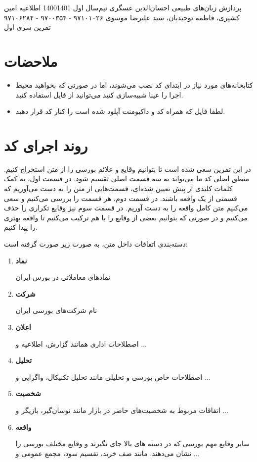 \documentclass[a4paper,12pt]{article}
\begin{document}
\handout
{پردازش زبان‌های طبیعی}
{احسان‌الدین عسگری}
{نیم‌سال اول 1400\lr{-}1401}
{اطلاعیه}
{امین کشیری، فاطمه توحیدیان، سید علیرضا موسوی}
{۹۷۱۰۱۰۲۶ - ۹۷۰۰۳۵۴ - ۹۷۱۰۶۲۸۴}
{تمرین سری اول}



\section*{ملاحضات}

\begin{itemize}
	\item 
	
	کتابخانه‌های مورد نیاز در ابتدای کد نصب می‌شوند، اما در صورتی که بخواهید محیط اجرا را 
عینا شبیه‌سازی کنید می‌توانید از فایل 
استفاده کنید. 

\item 
لطفا فایل 
که همراه کد و داکیومنت آپلود شده است را کنار کد قرار دهید.

\end{itemize}

\section*{روند اجرای کد}

در این تمرین سعی شده است تا بتوانیم وقایع و علائم بورسی را از متن استخراج کنیم. 
منطق اصلی کد ما می‌تواند به سه قسمت اصلی تقسیم شود. در قسمت اول، به کمک کلمات کلیدی 
از پیش تعیین شده‌ای، قسمت‌هایی از متن را به دست می‌آوریم که قسمتی از یک واقعه باشند. در قسمت 
دوم، هر قسمت را بررسی می‌کنیم و سعی می‌کنیم متن کامل واقعه را به دست آوریم. در قسمت سوم نیز وقایع تکراری 
را حذف می‌کنیم و در صورتی که بتوانیم بعضی از وقایع‌ را با هم ترکیب می‌کنیم تا واقعه بهتری 
را پیدا کنیم.

دسته‌بندی اتفاقات داخل متن، به صورت زیر صورت گرفته است: 
\begin{enumerate}
    \item \textbf{نماد}
    
    نمادهای معاملاتی در بورس ایران
    \item \textbf{شرکت}
    
    نام شرکت‌های بورسی ایران 
    \item \textbf{اعلان}
    
    اصطلاحات اداری همانند گزارش، اطلاعیه و ...
	\item \textbf{تحلیل}
	
	اصطلاحات خاص بورسی و تحلیلی مانند تحلیل تکنیکال، واگرایی و ...
	\item \textbf{شخصیت}
	
	  اتفاقات مربوط به شخصیت‌های حاضر در بازار مانند نوسان‌گیر، بازیگر و
	  ...
	\item  \textbf{واقعه}
	
	سایر وقایع مهم بورسی که در دسته های بالا جای نگیرند و وقایع مختلف بورسی را نشان می‌دهند. مانند صف خرید، تقسیم سود، مجمع عمومی و ...
\end{enumerate}
\end{document}
